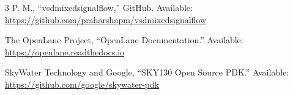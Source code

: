 \documentclass[10pt,conference]{IEEEtran}
\begin{document}
\begin{thebibliography}{3}
 P. M., ``vsdmixedsignalflow,'' GitHub. Available: \url{https://github.com/praharshapm/vsdmixedsignalflow}

The OpenLane Project, ``OpenLane Documentation.'' Available:
\url{https://openlane.readthedocs.io}

SkyWater Technology and Google, ``SKY130 Open Source PDK.'' Available:
\url{https://github.com/google/skywater-pdk}

\end{thebibliography}
\end{document}
